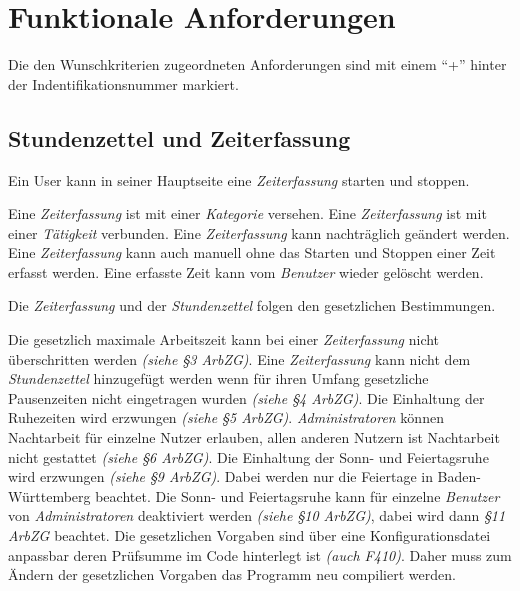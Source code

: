 \section{Funktionale Anforderungen}

Die den Wunschkriterien zugeordneten Anforderungen sind mit einem "`+"' hinter der Indentifikationsnummer markiert.

\subsection{Stundenzettel und Zeiterfassung}

\begin{requirements}
    Ein User kann in seiner Hauptseite eine \emph{Zeiterfassung} starten und stoppen.
    \begin{requirements}
         Eine \emph{Zeiterfassung} ist mit einer \emph{Kategorie} versehen.
         Eine \emph{Zeiterfassung} ist mit einer \emph{Tätigkeit} verbunden.
         Eine \emph{Zeiterfassung} kann nachträglich geändert werden.
         Eine \emph{Zeiterfassung} kann auch manuell ohne das Starten und Stoppen einer Zeit erfasst werden.
         Eine erfasste Zeit kann vom \emph{Benutzer} wieder gelöscht werden.
    \end{requirements}

    Die \emph{Zeiterfassung} und der \emph{Stundenzettel} folgen den gesetzlichen Bestimmungen.
    \begin{requirements}
         Die gesetzlich maximale Arbeitszeit kann bei einer \emph{Zeiterfassung} nicht überschritten werden \emph{(siehe §3 ArbZG)}.
         Eine \emph{Zeiterfassung} kann nicht dem \emph{Stundenzettel} hinzugefügt werden wenn für ihren Umfang gesetzliche Pausenzeiten nicht eingetragen wurden \emph{(siehe §4 ArbZG)}.
         Die Einhaltung der Ruhezeiten wird erzwungen \emph{(siehe §5 ArbZG)}.
         \emph{Administratoren} können Nachtarbeit für einzelne Nutzer erlauben, allen anderen Nutzern ist Nachtarbeit nicht gestattet \emph{(siehe §6 ArbZG)}.
         Die Einhaltung der Sonn- und Feiertagsruhe wird erzwungen \emph{(siehe §9 ArbZG)}.
                Dabei werden nur die Feiertage in Baden-Württemberg beachtet.
                Die Sonn- und Feiertagsruhe kann für einzelne \emph{Benutzer} von \emph{Administratoren} deaktiviert werden \emph{(siehe §10 ArbZG)}, dabei wird dann \emph{§11 ArbZG} beachtet.
         Die gesetzlichen Vorgaben sind über eine Konfigurationsdatei anpassbar deren Prüfsumme im Code hinterlegt ist \emph{(auch F410)}.
                Daher muss zum Ändern der gesetzlichen Vorgaben das Programm neu compiliert werden.
    \end{requirements}


\end{requirements}
